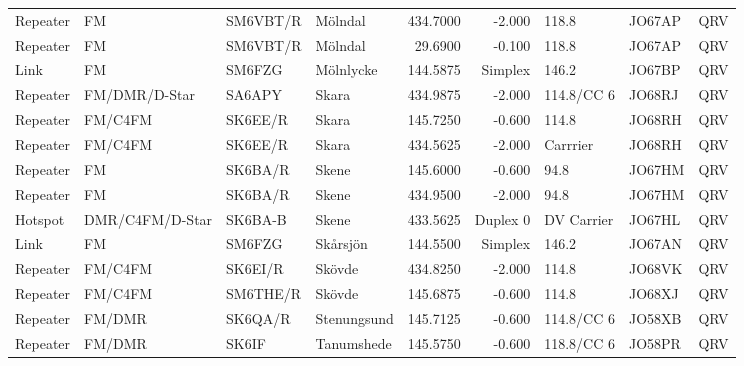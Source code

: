 \begin{landscape}
\begin{longtable}{llllrrlll}
	Repeater          & FM              & SM6VBT/R & Mölndal               &     434.7000 &     -2.000 & 118.8             & JO67AP      & QRV      \\
	Repeater          & FM              & SM6VBT/R & Mölndal               &      29.6900 &     -0.100 & 118.8             & JO67AP      & QRV      \\
	Link              & FM              & SM6FZG   & Mölnlycke             &     144.5875 &    Simplex & 146.2             & JO67BP      & QRV      \\
	Repeater          & FM/DMR/D-Star   & SA6APY   & Skara                 &     434.9875 &     -2.000 & 114.8/CC 6        & JO68RJ      & QRV      \\
	Repeater          & FM/C4FM         & SK6EE/R  & Skara                 &     145.7250 &     -0.600 & 114.8             & JO68RH      & QRV      \\
	Repeater          & FM/C4FM         & SK6EE/R  & Skara                 &     434.5625 &     -2.000 & Carrrier          & JO68RH      & QRV      \\
	Repeater          & FM              & SK6BA/R  & Skene                 &     145.6000 &     -0.600 & 94.8              & JO67HM      & QRV      \\
	Repeater          & FM              & SK6BA/R  & Skene                 &     434.9500 &     -2.000 & 94.8              & JO67HM      & QRV      \\
	Hotspot           & DMR/C4FM/D-Star & SK6BA-B  & Skene                 &     433.5625 &   Duplex 0 & DV Carrier        & JO67HL      & QRV      \\
	Link              & FM              & SM6FZG   & Skårsjön              &     144.5500 &    Simplex & 146.2             & JO67AN      & QRV      \\
	Repeater          & FM/C4FM         & SK6EI/R  & Skövde                &     434.8250 &     -2.000 & 114.8             & JO68VK      & QRV      \\
	Repeater          & FM/C4FM         & SM6THE/R & Skövde                &     145.6875 &     -0.600 & 114.8             & JO68XJ      & QRV      \\
	Repeater          & FM/DMR          & SK6QA/R  & Stenungsund           &     145.7125 &     -0.600 & 114.8/CC 6        & JO58XB      & QRV      \\
	Repeater          & FM/DMR          & SK6IF    & Tanumshede            &     145.5750 &     -0.600 & 118.8/CC 6        & JO58PR      & QRV      \\

\end{longtable}
\end{landscape}

